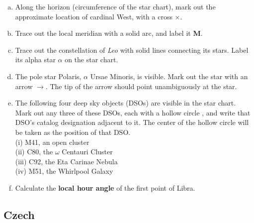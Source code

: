 \documentclass[a4paper,12pt]{extarticle}
\begin{document}
\begin{enumerate}[a.]
    \item Along the horizon (circumference of the star chart), mark out the approximate location of cardinal West, with a cross $\times$.
    \item Trace out the local meridian with a solid arc, and label it \textbf{M}. 
    \item  Trace out the constellation of \textit{Leo} with solid lines connecting its stars. Label its alpha star $\alpha$ on the star chart.
    \item  The pole star Polaris, $\alpha$ Ursae Minoris, is visible. Mark out the star with an arrow $\rightarrow$. The tip of the arrow should point unambiguously at the star.
    \item  The following four deep sky objects (DSOs) are visible in the star chart. Mark out any three of these DSOs, each with a hollow circle , and write that DSO’s catalog designation adjacent to it. The center of the hollow circle will be taken as the position of that DSO. \\
(i) M41, an open cluster\\
(ii) C80, the $\omega$ Centauri Cluster\\
(iii) C92, the Eta Carinae Nebula\\
(iv) M51, the Whirlpool Galaxy
    \item  Calculate the \textbf{local hour angle} of the first point of Libra. 
\end{enumerate}

\subsection{Czech}
\end{document}
